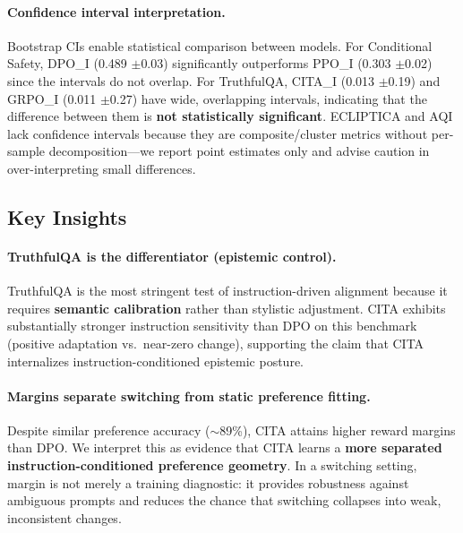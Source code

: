 \paragraph{Confidence interval interpretation.}
Bootstrap CIs enable statistical comparison between models.
For Conditional Safety, DPO\_I (0.489 $\pm$0.03) significantly outperforms PPO\_I (0.303 $\pm$0.02) since the intervals do not overlap.
For TruthfulQA, CITA\_I (0.013 $\pm$0.19) and GRPO\_I (0.011 $\pm$0.27) have wide, overlapping intervals, indicating that the difference between them is \textbf{not statistically significant}.
ECLIPTICA and AQI lack confidence intervals because they are composite/cluster metrics without per-sample decomposition---we report point estimates only and advise caution in over-interpreting small differences.

\vspace{-1mm}
\subsection{Key Insights}
\label{sec:key_insights}

\paragraph{\textbf{TruthfulQA is the differentiator (epistemic control).}}
TruthfulQA is the most stringent test of instruction-driven alignment because it requires \textbf{semantic calibration} rather than stylistic adjustment.
\textsc{CITA} exhibits substantially stronger instruction sensitivity than DPO on this benchmark (positive adaptation vs.\ near-zero change), supporting the claim that \textsc{CITA} internalizes instruction-conditioned epistemic posture.

\paragraph{\textbf{Margins separate switching from static preference fitting.}}
Despite similar preference accuracy ($\sim$89\%), \textsc{CITA} attains higher reward margins than DPO.
We interpret this as evidence that \textsc{CITA} learns a \textbf{more separated instruction-conditioned preference geometry}.
In a switching setting, margin is not merely a training diagnostic: it provides robustness against ambiguous prompts and reduces the chance that switching collapses into weak, inconsistent changes.

